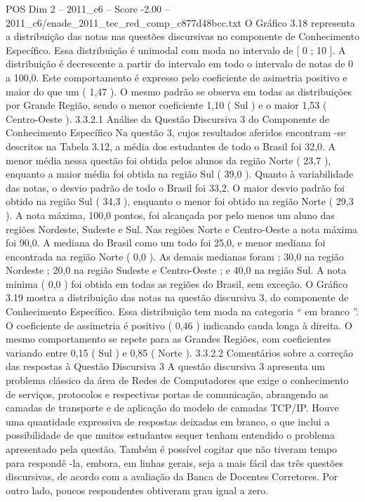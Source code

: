 \begin{textsample}{POS Dim 2 – 2011\_c6 – Score -2.00 – 2011\_c6/enade\_2011\_tec\_red\_comp\_c877d48bcc.txt}
O Gráfico 3.18 representa a distribuição das notas nas questões discursivas no componente de Conhecimento Específico.
Essa distribuição é unimodal com moda no intervalo de [ 0 ; 10 ].
A distribuição é decrescente a partir do intervalo em todo o intervalo de notas de 0 a 100,0.
Este comportamento é expresso pelo coeficiente de asimetria positivo e maior do que um ( 1,47 ).
O mesmo padrão se observa em todas as distribuições por Grande Região, sendo o menor coeficiente 1,10 ( Sul ) e o maior 1,53 ( Centro-Oeste ). 3.3.2.1 Análise da Questão Discursiva 3 do Componente de Conhecimento Específico Na questão 3, cujos resultados aferidos encontram -se descritos na Tabela 3.12, a média dos estudantes de todo o Brasil foi 32,0.
A menor média nessa questão foi obtida pelos alunos da região Norte ( 23,7 ), enquanto a maior média foi obtida na região Sul ( 39,0 ).
Quanto à variabilidade das notas, o desvio padrão de todo o Brasil foi 33,2.
O maior desvio padrão foi obtido na região Sul ( 34,3 ), enquanto o menor foi obtido na região Norte ( 29,3 ).
A nota máxima, 100,0 pontos, foi alcançada por pelo menos um aluno das regiões Nordeste, Sudeste e Sul.
Nas regiões Norte e Centro-Oeste a nota máxima foi 90,0.
A mediana do Brasil como um todo foi 25,0, e menor mediana foi encontrada na região Norte ( 0,0 ).
As demais medianas foram : 30,0 na região Nordeste ; 20,0 na região Sudeste e Centro-Oeste ; e 40,0 na região Sul.
A nota mínima ( 0,0 ) foi obtida em todas as regiões do Brasil, sem exceção.
O Gráfico 3.19 mostra a distribuição das notas na questão discursiva 3, do componente de Conhecimento Específico.
Essa distribuição tem moda na categoria “ em branco ”.
O coeficiente de assimetria é positivo ( 0,46 ) indicando cauda longa à direita.
O mesmo comportamento se repete para as Grandes Regiões, com coeficientes variando entre 0,15 ( Sul ) e 0,85 ( Norte ). 3.3.2.2 Comentários sobre a correção das respostas à Questão Discursiva 3 A questão discursiva 3 apresenta um problema clássico da área de Redes de Computadores que exige o conhecimento de serviços, protocolos e respectivas portas de comunicação, abrangendo as camadas de transporte e de aplicação do modelo de camadas TCP/IP.
Houve uma quantidade expressiva de respostas deixadas em branco, o que inclui a possibilidade de que muitos estudantes sequer tenham entendido o problema apresentado pela questão.
Também é possível cogitar que não tiveram tempo para respondê -la, embora, em linhas gerais, seja a mais fácil das três questões discursivas, de acordo com a avaliação da Banca de Docentes Corretores.
Por outro lado, poucos respondentes obtiveram grau igual a zero.

\end{textsample}
